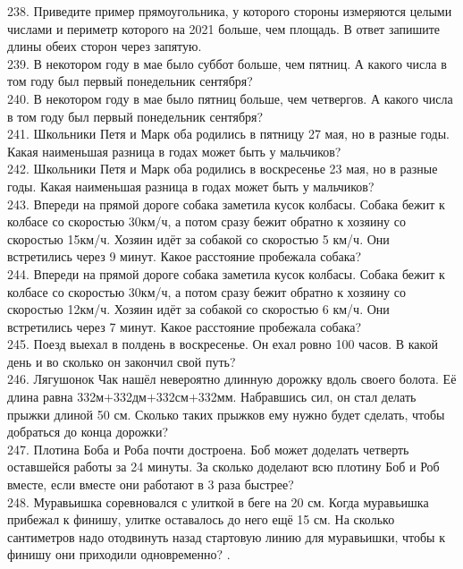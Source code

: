 \documentclass[12pt]{article}
\begin{document}
238. Приведите пример прямоугольника, у которого стороны измеряются целыми числами и периметр которого на 2021 больше, чем площадь. В ответ запишите длины обеих сторон через запятую.\\
239. В некотором году в мае было суббот больше, чем пятниц. А какого числа в том году был первый понедельник сентября?\\
240. В некотором году в мае было пятниц больше, чем четвергов. А какого числа в том году был первый понедельник сентября?\\
241. Школьники Петя и Марк оба родились в пятницу 27 мая, но в разные годы. Какая наименьшая разница в годах может быть у мальчиков?\\
242. Школьники Петя и Марк оба родились в воскресенье 23 мая, но в разные годы. Какая наименьшая разница в годах может быть у мальчиков?\\
243. Впереди на прямой дороге собака заметила кусок колбасы. Собака бежит к колбасе со скоростью 30км/ч, а потом сразу бежит обратно к хозяину со скоростью 15км/ч. Хозяин идёт за собакой со скоростью 5 км/ч. Они встретились через 9 минут. Какое расстояние пробежала собака?\\
244. Впереди на прямой дороге собака заметила кусок колбасы. Собака бежит к колбасе со скоростью 30км/ч, а потом сразу бежит обратно к хозяину со скоростью 12км/ч. Хозяин идёт за собакой со скоростью 6 км/ч. Они встретились через 7 минут. Какое расстояние пробежала собака?\\
245. Поезд выехал в полдень в воскресенье. Он ехал ровно 100 часов. В какой день и во сколько он закончил свой путь?\\
246. Лягушонок Чак нашёл невероятно длинную дорожку вдоль своего болота. Её длина равна 332м$+$332дм$+$332см$+$332мм. Набравшись сил, он стал делать прыжки длиной 50 см. Сколько таких прыжков ему нужно будет сделать, чтобы добраться до конца дорожки?\\
247. Плотина Боба и Роба почти достроена. Боб может доделать четверть оставшейся работы за 24 минуты. За сколько доделают всю плотину Боб и Роб вместе, если вместе они работают в 3 раза быстрее?\\
248. Муравьишка соревновался с улиткой в беге на 20 см. Когда муравьишка прибежал к финишу, улитке оставалось до него ещё 15 см. На сколько сантиметров надо отодвинуть назад стартовую линию для муравьишки, чтобы к финишу они приходили одновременно?\newpage
{}. \begin{center}
\begin{figure}[ht!]
\end{figure}
\end{center}
\end{document}
